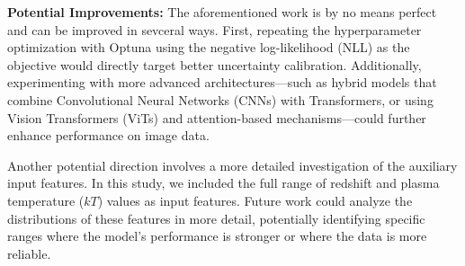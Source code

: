 \textbf{Potential Improvements:}
The aforementioned work is by no means perfect and
can be improved in sevceral ways. First, repeating the 
hyperparameter optimization with Optuna using 
the negative log-likelihood (NLL) as the objective 
would directly target better uncertainty calibration.
Additionally, 
experimenting with more advanced architectures—such as 
hybrid models that combine Convolutional Neural Networks 
(CNNs) with Transformers, or using Vision Transformers 
(ViTs) and attention-based mechanisms—could further enhance
performance on image data. 

Another potential direction involves a more detailed investigation 
of the auxiliary input features. In this study, we included the full 
range of redshift and plasma temperature ($kT$) values as input features. 
Future work could analyze the distributions of these features in more 
detail, potentially identifying specific ranges where the model's 
performance is stronger or where the data is more reliable. 


